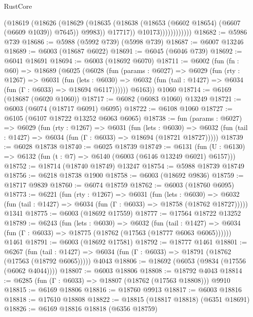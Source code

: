 \begin{lexlean}{RustCore}
\begin{coremodule}
                            (@18619
                              (@18626
                                (@18629
                                  (@18635
                                    (@18638 (@18653 (@6602 @18654) (@6607 (@6609 @1039)) @7645))
                                    @9983))
                                @17717))
                            @10173))))))))))))
@18682 := @5986 @739
@18686 := @5988 (@5992 @739) (@5998 @739)
@18687 := @6007 @13246
@18689 := @6003 (@18687 @6022)
@18691 := @6045 (@6046 @739)
@18692 := @6041 @18691
@18694 := @6003 (@18692 @6070)
@18711 := @6002
    (fun (fn : @60) =>
    @18689
      (@6025
        (@6028
          (fun (params : @6027) =>
          @6029
            (fun (rty : @1267) =>
            @6031
              (fun (lets : @6030) =>
              @6032 (fun (tail : @1427) => @6034 (fun (Γ : @6033) => @18694 @6117))))))
        @6163))
    @1060
@18714 := @6169 (@18687 (@6020 @1060))
@18717 := @6082 (@6083 @1060) @13249
@18721 := @6003 (@6074 (@18717 @6091) @6095)
@18722 := @6108 @1060
@18727 := @6105 (@6107 @18722 @13252 @6063 @6065)
@18738 := fun (params : @6027) =>
  @6029
    (fun (rty : @1267) =>
    @6031
      (fun (lets : @6030) =>
      @6032 (fun (tail : @1427) => @6034 (fun (Γ : @6033) => @18694 (@18721 @18727)))))
@18739 := @6028 @18738
@18740 := @6025 @18739
@18749 := @6131
    (fun (U : @6130) => @6132 (fun (t : @7) => @6140 (@6003 (@6146 @13249 @6021) @6157)))
@18752 := @18714 (@18740 @18749) @13247
@18754 := @5988 @18739 @18749
@18756 := @6218 @18738 @1900
@18758 := @6003 (@18692 @9836)
@18759 := @18717 @9839
@18760 := @6074 @18759
@18762 := @6003 (@18760 @6095)
@18773 := @6221
    (fun (rty : @1267) =>
    @6031
      (fun (lets : @6030) =>
      @6032 (fun (tail : @1427) => @6034 (fun (Γ : @6033) => @18758 (@18762 @18727)))))
    @1341
@18775 := @6003 (@18692 @17559)
@18777 := @17564 @18722 @13252
@18789 := @6243
    (fun (lets : @6030) =>
    @6032
      (fun (tail : @1427) =>
      @6034 (fun (Γ : @6033) => @18775 (@18762 (@17563 (@18777 @6063 @6065))))))
    @1461
@18791 := @6003 (@18692 @17581)
@18792 := @18777 @1461
@18801 := @6267
    (fun (tail : @1427) => @6034 (fun (Γ : @6033) => @18791 (@18762 (@17563 (@18792 @6065)))))
    @4043
@18806 := @18692 (@6053 (@9834 (@17556 (@6062 @4044))))
@18807 := @6003 @18806
@18808 := @18792 @4043
@18814 := @6285 (fun (Γ : @6033) => @18807 (@18762 (@17563 @18808))) @9910
@18815 := @6169 @18806
@18816 := @18760 @9913
@18817 := @6003 @18816
@18818 := @17610 @18808
@18822 := @18815 (@18817 @18818) (@6351 @18691)
@18826 := @6169 @18816 @18818 (@6356 @18759)

\end{coremodule}
\end{lexlean}
